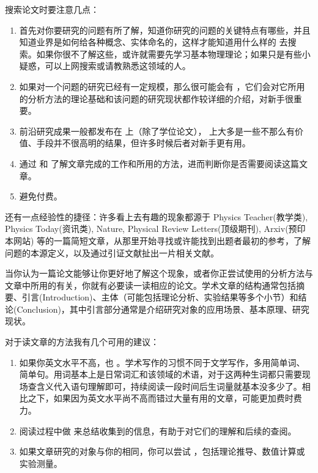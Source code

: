 \documentclass[a4paper,10pt,english]{sphinxmanual}
\begin{document}
搜索论文时要注意几点：
\begin{enumerate}
\item {} 
首先对你要研究的问题有所了解，知道你研究的问题的关键特点有哪些，并且知道业界是如何给各种概念、实体命名的，这样才能知道用什么样的  去搜索。如果你很不了解这些，或许就需要先学习基本物理理论；如果只是有些小疑惑，可以上网搜索或请教熟悉这领域的人。

\item {} 
如果对一个问题的研究已经有一定规模，那么很可能会有  ，它们会对它所用的分析方法的理论基础和该问题的研究现状都作较详细的介绍，对新手很重要。

\item {} 
前沿研究成果一般都发布在  上（除了学位论文），  上大多是一些不那么有价值、手段并不很高明的结果，但许多时候后者对新手更有用。

\item {} 
通过  和  了解文章完成的工作和所用的方法，进而判断你是否需要阅读这篇文章。

\item {} 
避免付费。

\end{enumerate}

还有一点经验性的捷径：许多看上去有趣的现象都源于 Physics Teacher(教学类), Physics Today(资讯类), Nature, Physical Review Letters(顶级期刊), Arxiv(预印本网站) 等的一篇简短文章，从那里开始寻找或许能找到出题者最初的参考，了解问题的本源定义，以及通过引证文献扯出一片相关文献。

当你认为一篇论文能够让你更好地了解这个现象，或者你正尝试使用的分析方法与文章中所用的有关，你就有必要读一读相应的论文。学术文章的结构通常包括摘要、引言(Introduction)、主体（可能包括理论分析、实验结果等多个小节）和结论(Conclusion)，其中引言部分通常是介绍研究对象的应用场景、基本原理、研究现状。

对于读文章的方法我有几个可用的建议：
\begin{enumerate}
\item {} 
如果你英文水平不高，也  。学术写作的习惯不同于文学写作，多用简单词、简单句。用词基本上是日常词汇和该领域的术语，对于这两种生词都只需要现场查含义代入语句理解即可，持续阅读一段时间后生词量就基本没多少了。相比之下，如果因为英文水平尚不高而错过大量有用的文章，可能更加费时费力。

\item {} 
阅读过程中做  来总结收集到的信息，有助于对它们的理解和后续的查阅。

\item {} 
如果文章研究的对象与你的相同，你可以尝试  ，包括理论推导、数值计算或实验测量。

\end{enumerate}
\end{document}
